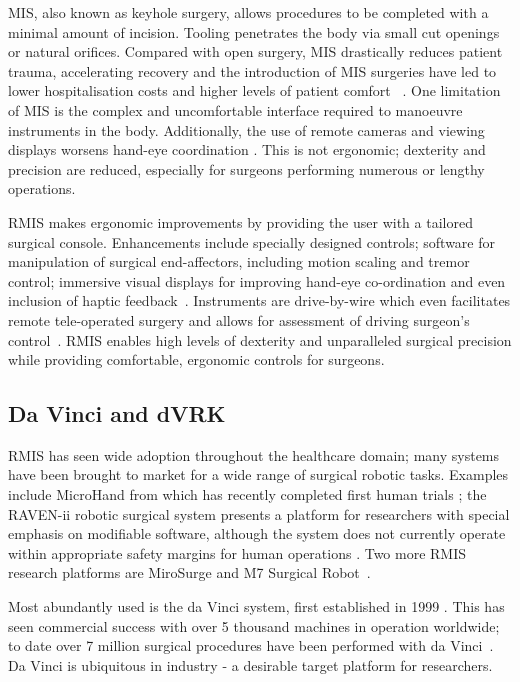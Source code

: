 \documentclass[english]{sobraep}
\begin{document}
\par{MIS, also known as keyhole surgery, allows procedures to be completed with a minimal amount of incision. Tooling penetrates the body via small cut openings or natural orifices. Compared with open surgery, MIS drastically reduces patient trauma, accelerating recovery and the introduction of MIS surgeries have led to lower hospitalisation costs and higher levels of patient comfort ~\cite{laparoscopic-vs-open,intro-rmis}. One limitation of MIS is the complex and uncomfortable interface required to manoeuvre instruments in the body. Additionally, the use of remote cameras and viewing displays worsens hand-eye coordination \cite{intro-rmis, force-sensing}. This is not ergonomic; dexterity and precision are reduced, especially for surgeons performing numerous or lengthy operations.}

\par{RMIS makes ergonomic improvements by providing the user with a tailored surgical console. Enhancements include specially designed controls; software for manipulation of surgical end-affectors, including motion scaling and tremor control; immersive visual displays for improving hand-eye co-ordination and even inclusion of haptic feedback~\cite{intro-rmis}. Instruments are drive-by-wire which even facilitates remote tele-operated surgery and allows for assessment of driving surgeon's control~\cite{ergonomics}. RMIS enables high levels of dexterity and unparalleled surgical precision while providing comfortable, ergonomic controls for surgeons.} 

\subsection{Da Vinci and dVRK}
\par{RMIS has seen wide adoption throughout the healthcare domain; many systems have been brought to market for a wide range of surgical robotic tasks. Examples include MicroHand from \citeauthor{microhand2} which has recently completed first human trials \cite{microhand2}; the RAVEN-ii robotic surgical system presents a platform for researchers with special emphasis on modifiable software, although the system does not currently operate within appropriate safety margins for human operations \cite{raven-ii}. Two more RMIS research platforms are MiroSurge and M7 Surgical Robot~\cite[Table 1]{other-rmis-machines}.}

\par{Most abundantly used is the da Vinci system, first established in 1999 \cite{ergonomics, 10-years-dvrk}. This has seen commercial success with over 5 thousand machines in operation worldwide; to date over 7 million surgical procedures have been performed with da Vinci~\cite{10-years-dvrk}. Da Vinci is ubiquitous in industry - a desirable target platform for researchers.}
\end{document}

